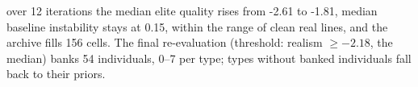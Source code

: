 over 12 iterations the median elite quality rises from -2.61 to -1.81, median baseline instability stays at 0.15, within the range of clean real lines, and the archive fills 156 cells. The final re-evaluation (threshold: realism $\ge -2.18$, the median) banks 54 individuals, 0--7 per type; types without banked individuals fall back to their priors.
